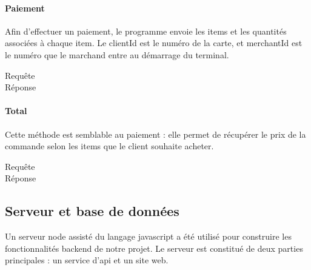 			\paragraph{Paiement}
			Afin d’effectuer un paiement, le programme envoie les items et les quantités associées à chaque item. Le \og clientId \fg{} est le numéro de la carte, et \og merchantId \fg{} est le numéro que le marchand entre au démarrage du terminal.
			\begin{multicols}{2}	
				\begin{description}
					\item[Requête]  %
					
					\vfill\null \columnbreak
					\item[Réponse]  %
					
				\end{description}
			\end{multicols}

			\paragraph{Total}
			Cette méthode est semblable au paiement : elle permet de récupérer le prix de la commande selon les items que le client souhaite acheter.
			\begin{multicols}{2}	
				\begin{description}
					\item[Requête]  %
					
					\vfill\null \columnbreak
					\item[Réponse]  %
					
				\end{description}
			\end{multicols}

	\subsection{Serveur et base de données}
		Un serveur \og node \fg{} assisté du langage javascript a été utilisé pour construire les fonctionnalités \og backend \fg{} de notre projet. Le serveur est constitué de deux parties principales : un service d’api et un site web. 
		
